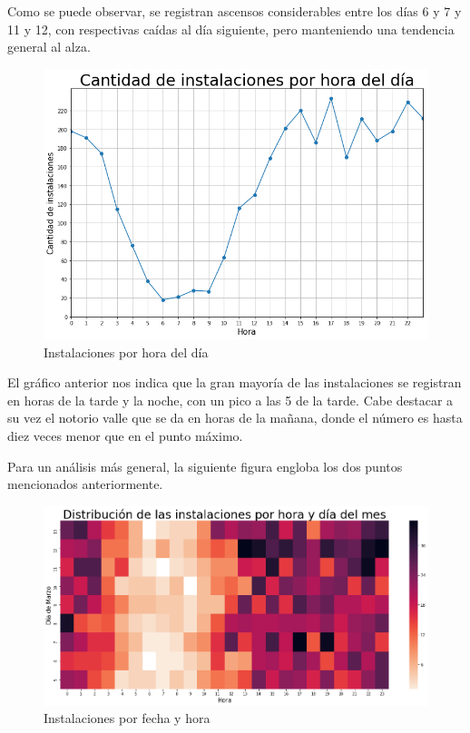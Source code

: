 \documentclass[a4paper, 12pt]{article}
\begin{document}
		Como se puede observar, se registran ascensos considerables entre los días 6 y 7 y 11 y 12, con respectivas caídas al día siguiente, pero manteniendo una tendencia general al alza.
		
		\FloatBarrier
		\begin{figure}[h]
			\centering
			\includegraphics[width=\textwidth]{images/installs/installsxhora.png}
			\caption{Instalaciones por hora del día}
		\end{figure}
		\FloatBarrier
		
		 El gráfico anterior nos indica que la gran mayoría de las instalaciones se registran en horas de la tarde y la noche, con un pico a las 5 de la tarde. Cabe destacar a su vez el notorio valle que se da en horas de la mañana, donde el número es hasta diez veces menor que en el punto máximo.
		 
		 Para un análisis más general, la siguiente figura engloba los dos puntos mencionados anteriormente.
		 
		\FloatBarrier
		\begin{figure}[h]
			\centering
			\includegraphics[width=\textwidth]{images/installs/heatmapfecha.png}
			\caption{Instalaciones por fecha y hora}
		\end{figure}
		\FloatBarrier
		
\end{document}
